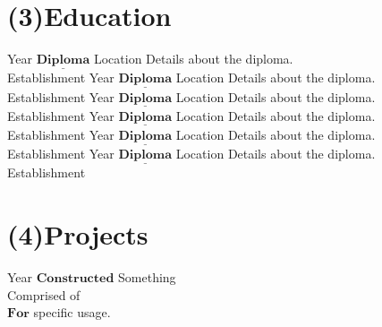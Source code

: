 \documentclass[usenames,dvipsnames,a4paper]{English_Resume}
\begin{document}
\section{(3)Education}
	\begin{twenty}
		\twentyitem
			{Year}
			{$\underline{\mathbf{Diploma}}$}
			{Location}
			{Details about the diploma.
			\\Establishment}
		\twentyitem
			{Year}
			{$\underline{\mathbf{Diploma}}$}
			{Location}
			{Details about the diploma.
			\\Establishment}
		\twentyitem
			{Year}
			{$\underline{\mathbf{Diploma}}$}
			{Location}
			{Details about the diploma.
			\\Establishment}
		\twentyitem
			{Year}
			{$\underline{\mathbf{Diploma}}$}
			{Location}
			{Details about the diploma.
			\\Establishment}
		\twentyitem
			{Year}
			{$\underline{\mathbf{Diploma}}$}
			{Location}
			{Details about the diploma.
			\\Establishment}
		\twentyitem
			{Year}
			{$\underline{\mathbf{Diploma}}$}
			{Location}
			{Details about the diploma.
			\\Establishment}
	\end{twenty}
	
\section{(4)Projects}
	\begin{twentyshort}
		\twentyitemshort
			{Year}
			{$\mathbf{Constructed}$ Something
			\\ Comprised of
			\\ $\mathbf{For}$ specific usage.}			
	\end{twentyshort}
\begin{center}
\vspace{135pt}
\color{Fuchsia}{\footnotesize $Created\; With\;$\LaTeX $\;On\; Your Personal OS Installation$}
\vspace{-10pt}
\end{center}
\end{document}
